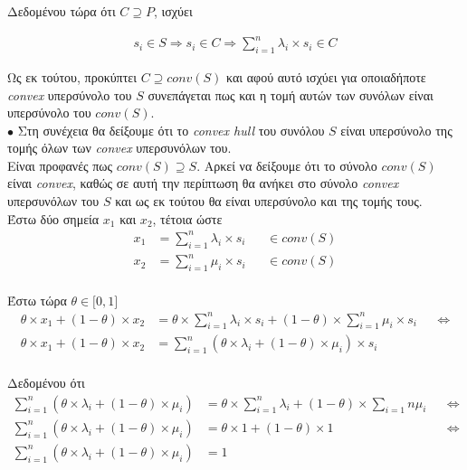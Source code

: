 \documentclass[12pt]{article}
\begin{document}
Δεδομένου τώρα ότι $C \supseteq P$, ισχύει

\begin{align*}
    s_i \in S \Rightarrow s_i \in C \Rightarrow \sum_{i = 1}^{n} λ_i \times s_i \in C
\end{align*}

Ως εκ τούτου, προκύπτει $C \supseteq conv(S)$ και αφού αυτό ισχύει για οποιαδήποτε \textit{convex}
υπερσύνολο του $S$ συνεπάγεται πως και η τομή αυτών των συνόλων είναι υπερσύνολο του $conv(S)$.\\

$\bullet$ Στη συνέχεια θα δείξουμε ότι το \textit{convex hull} του συνόλου $S$ είναι υπερσύνολο της
τομής όλων των \textit{convex} υπερσυνόλων του.\\

Είναι προφανές πως $conv(S) \supseteq S$. Αρκεί να δείξουμε ότι το σύνολο $conv(S)$
είναι \textit{convex}, καθώς σε αυτή την περίπτωση θα ανήκει στο σύνολο \textit{convex} υπερσυνόλων του
$S$ και ως εκ τούτου θα είναι υπερσύνολο και της τομής τους.\\

Έστω δύο σημεία $x_1$ και $x_2$, τέτοια ώστε\\

\begin{align*}
    x_1 & = \sum_{i = 1}^{n} λ_i \times s_i && \in conv(S) \\
    x_2 & = \sum_{i = 1}^{n} μ_i \times s_i && \in conv(S)
\end{align*}\\

Έστω τώρα $\theta \in \lbrack 0, 1 \rbrack$\\

\begin{align*}
    \theta \times x_1 + (1 - \theta) \times x_2 & = \theta \times \sum_{i = 1}^{n} λ_i \times s_i + (1 - \theta) \times \sum_{i = 1}^{n} μ_i \times s_i && \Leftrightarrow \\
    \theta \times x_1 + (1 - \theta) \times x_2 & = \sum_{i = 1}^{n}(\theta \times λ_i + (1 - \theta) \times μ_i) \times s_i
\end{align*}\\

Δεδομένου ότι\\

\begin{align*}
    \sum_{i = 1}^{n}(\theta \times λ_i + (1 - \theta) \times μ_i) & = \theta \times \sum_{i = 1}^{n} λ_i + (1 - \theta) \times \sum_{i = 1}{n} μ_i && \Leftrightarrow \\
    \sum_{i = 1}^{n}(\theta \times λ_i + (1 - \theta) \times μ_i) & = \theta \times 1 + (1 - \theta) \times 1 && \Leftrightarrow \\
    \sum_{i = 1}^{n}(\theta \times λ_i + (1 - \theta) \times μ_i) & = 1
\end{align*}\\
\end{document}
